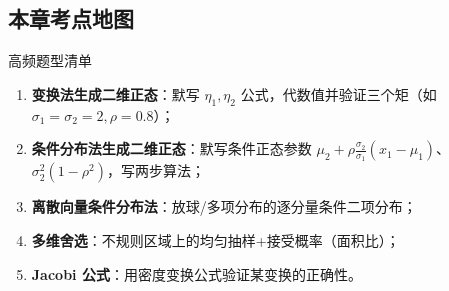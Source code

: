 \subsection{本章考点地图}

\begin{ebox}{高频题型清单}
\begin{enumerate}[leftmargin=2em]
  \item \textbf{变换法生成二维正态}：默写 $\eta_1,\eta_2$ 公式，代数值并验证三个矩（如 $\sigma_1=\sigma_2=2,\rho=0.8$）；
  \item \textbf{条件分布法生成二维正态}：默写条件正态参数 $\mu_2+\rho\frac{\sigma_2}{\sigma_1}(x_1-\mu_1)$、$\sigma_2^2(1-\rho^2)$，写两步算法；
  \item \textbf{离散向量条件分布法}：放球/多项分布的逐分量条件二项分布；
  \item \textbf{多维舍选}：不规则区域上的均匀抽样+接受概率（面积比）；
  \item \textbf{Jacobi 公式}：用密度变换公式验证某变换的正确性。
\end{enumerate}
\end{ebox}
